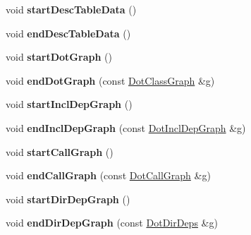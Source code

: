 \begin{DoxyCompactItemize}
\item 
\hypertarget{class_output_list_ade74ab43d9c69e30b4344e7d176bd07e}{void {\bfseries start\-Desc\-Table\-Data} ()}\label{class_output_list_ade74ab43d9c69e30b4344e7d176bd07e}

\item 
\hypertarget{class_output_list_aba60999e7c19eb5c546be43e157de98d}{void {\bfseries end\-Desc\-Table\-Data} ()}\label{class_output_list_aba60999e7c19eb5c546be43e157de98d}

\item 
\hypertarget{class_output_list_a3ea98cf1d0374587532fd534eb207de3}{void {\bfseries start\-Dot\-Graph} ()}\label{class_output_list_a3ea98cf1d0374587532fd534eb207de3}

\item 
\hypertarget{class_output_list_a823fd139095f21ebf78ec23a90cb7a24}{void {\bfseries end\-Dot\-Graph} (const \hyperlink{class_dot_class_graph}{Dot\-Class\-Graph} \&g)}\label{class_output_list_a823fd139095f21ebf78ec23a90cb7a24}

\item 
\hypertarget{class_output_list_a94461be722782868a8ecb74a7fe44a35}{void {\bfseries start\-Incl\-Dep\-Graph} ()}\label{class_output_list_a94461be722782868a8ecb74a7fe44a35}

\item 
\hypertarget{class_output_list_af66232045963e5255faf33c600fb1be3}{void {\bfseries end\-Incl\-Dep\-Graph} (const \hyperlink{class_dot_incl_dep_graph}{Dot\-Incl\-Dep\-Graph} \&g)}\label{class_output_list_af66232045963e5255faf33c600fb1be3}

\item 
\hypertarget{class_output_list_a8b9ae07c2a7ca51c0100e5258c16b663}{void {\bfseries start\-Call\-Graph} ()}\label{class_output_list_a8b9ae07c2a7ca51c0100e5258c16b663}

\item 
\hypertarget{class_output_list_acdc4833b30336e37e5d0940e49595b70}{void {\bfseries end\-Call\-Graph} (const \hyperlink{class_dot_call_graph}{Dot\-Call\-Graph} \&g)}\label{class_output_list_acdc4833b30336e37e5d0940e49595b70}

\item 
\hypertarget{class_output_list_a071f06d58679ecf7077e1bb4335b798c}{void {\bfseries start\-Dir\-Dep\-Graph} ()}\label{class_output_list_a071f06d58679ecf7077e1bb4335b798c}

\item 
\hypertarget{class_output_list_a074b02c465c6db3a6252095c906511ab}{void {\bfseries end\-Dir\-Dep\-Graph} (const \hyperlink{class_dot_dir_deps}{Dot\-Dir\-Deps} \&g)}\label{class_output_list_a074b02c465c6db3a6252095c906511ab}


\end{DoxyCompactItemize}
